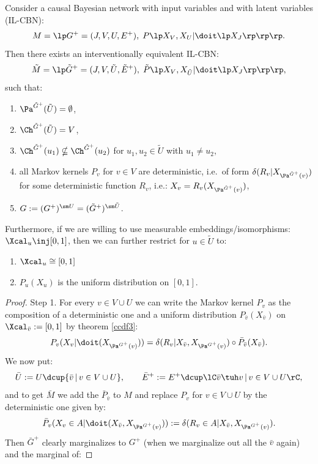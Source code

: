 \begin{Thm}
    \label{bcn-scm}
Consider a causal Bayesian network with input variables and with latent variables (IL-CBN):
     \[M= \lp G^+=(J,V,U,E^+), \; P\lp X_{V}, X_{U}| \doit\lp X_{J} \rp\rp \rp.\]
Then there exists an interventionally equivalent IL-CBN:
\[ \tilde M = \lp \tilde G^+=(J,V,\tilde U,\tilde E^+), \; \tilde P\lp X_{V}, X_{\tilde U}| \doit\lp X_{J} \rp\rp \rp,\]
such that:
\begin{enumerate}
    \item $\Pa^{\tilde G^+}(\tilde U) = \emptyset$,
    \item $\Ch^{\tilde G^+}(\tilde U) = V$,
    \item $\Ch^{\tilde G^+}(u_1) \nsubseteq \Ch^{\tilde G^+}(u_2)$ for $u_1,u_2 \in \tilde U$ with $u_1\neq u_2$,
    \item all Markov kernels $P_v$ for $v\in V$ are deterministic, i.e.\ of form $\delta(R_v|X_{\Pa^{\tilde G^+}(v)})$ 
        for some deterministic function $R_v$, i.e.: $X_v = R_v(X_{\Pa^{\tilde G^+}(v)})$,
    \item $G:=(G^+)^{\sm U} = (\tilde G^+)^{\sm \tilde U}$.
\end{enumerate}
Furthermore, if we are willing to use measurable embeddings/isomorphisms: $\Xcal_u \inj [0,1]$, then we 
can further restrict for $u \in \tilde U$ to:
\begin{enumerate}[resume]
    \item $\Xcal_u \cong [0,1]$
    \item $P_u(X_u)$ is the uniform distribution on $[0,1]$.
\end{enumerate}
\begin{proof}
    Step 1. For every $v \in V \cup U$ we can write the Markov kernel $P_v$ as the composition of a deterministic one and 
    a uniform distribution $P_{\bar v}(X_{\bar v})$ on $\Xcal_{\bar v}:=[0,1]$ by theorem \ref{ccdf3}:
    \[ P_v(X_v|\doit(X_{\Pa^{G^+}(v)})) = \delta(R_v|X_{\bar v}, X_{\Pa^{G^+}(v)}) \circ \bar P_{\bar v}(X_{\bar v}). \]
    We now put:
    \[ \bar U := U \dcup \{ \bar v\,|\, v \in V \cup U\},\qquad \bar E^+ := E^+ \dcup \lC \bar v \tuh v\,|\, v \in V \cup U \rC, \]
    and to get $\bar M$ we add the $\bar P_{\bar v}$ to $M$ and replace $P_v$ for $v \in V \cup U$ 
    by the deterministic one given by:
    \[ \bar P_v(X_v \in A|\doit(X_{\bar v},X_{\Pa^{G^+}(v)})) :=  \delta(R_v \in A|X_{\bar v}, X_{\Pa^{G^+}(v)}). \]
    Then $\bar G^+$ clearly marginalizes to $G^+$ (when we marginalize out all the $\bar v$ again) and the marginal of:

\end{proof}
\end{Thm}
